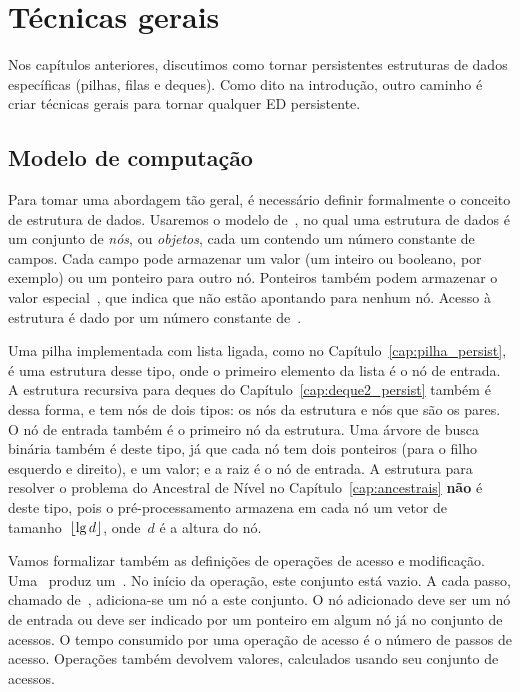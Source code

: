 \documentclass[main.tex]{subfiles}
\begin{document}
\chapter{Técnicas gerais} \label{cap:geral_persist}

Nos capítulos anteriores, discutimos como tornar persistentes estruturas de dados específicas (pilhas, filas e deques). Como dito na introdução, outro caminho é criar técnicas gerais para tornar qualquer ED persistente.


\section{Modelo de computação} \label{sec:mod_comp}

Para tomar uma abordagem tão geral, é necessário definir formalmente o conceito de estrutura de dados.  Usaremos o modelo de~, no qual uma estrutura de dados é um conjunto de \emph{nós}, ou \emph{objetos}, cada um contendo um número constante de campos. Cada campo pode armazenar um valor (um inteiro ou booleano, por exemplo) ou um ponteiro para outro nó. Ponteiros também podem armazenar o valor especial~, que indica que não estão apontando para nenhum nó.  Acesso à estrutura é dado por um número constante de~.

Uma pilha implementada com lista ligada, como no Capítulo~\ref{cap:pilha_persist}, é uma estrutura desse tipo, onde o primeiro elemento da lista é o nó de entrada. A estrutura recursiva para deques do Capítulo~\ref{cap:deque2_persist} também é dessa forma, e tem nós de dois tipos: os nós da estrutura e nós que são os pares. O nó de entrada também é o primeiro nó da estrutura.  Uma árvore de busca binária também é deste tipo, já que cada nó tem dois ponteiros (para o filho esquerdo e direito), e um valor; e a raiz é o nó de entrada. A estrutura para resolver o problema do Ancestral de Nível no Capítulo~\ref{cap:ancestrais} \textbf{não} é deste tipo, pois o pré-processamento armazena em cada nó um vetor de tamanho~$\lfloor\lg d\rfloor$, onde~$d$ é a altura do nó.

Vamos formalizar também as definições de operações de acesso e modificação. Uma~ produz um~. No início da operação, este conjunto está vazio.  A cada passo, chamado de~, adiciona-se um nó a este conjunto. O nó adicionado deve ser um nó de entrada ou deve ser indicado por um ponteiro em algum nó já no conjunto de acessos. O tempo consumido por uma operação de acesso é o número de passos de acesso. Operações também devolvem valores, calculados usando seu conjunto de acessos.
\end{document}
